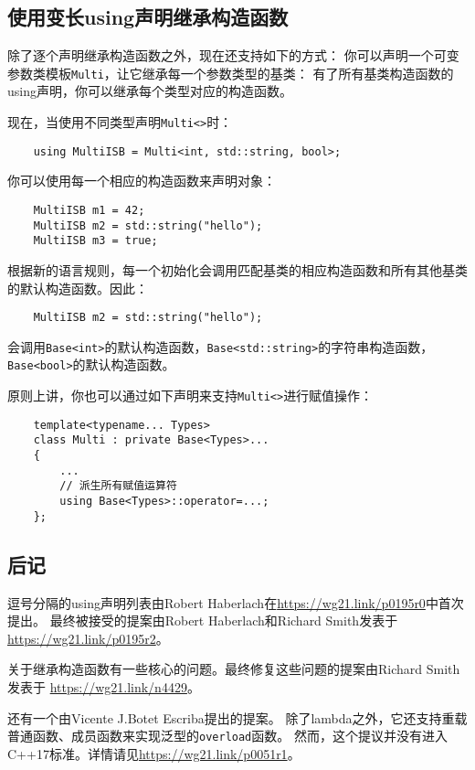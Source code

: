 \subsection{使用变长using声明继承构造函数}
除了逐个声明继承构造函数之外，现在还支持如下的方式：
你可以声明一个可变参数类模板\texttt{Multi}，让它继承每一个参数类型的基类：
有了所有基类构造函数的using声明，你可以继承每个类型对应的构造函数。

现在，当使用不同类型声明\texttt{Multi<>}时：
\begin{lstlisting}
    using MultiISB = Multi<int, std::string, bool>;
\end{lstlisting}
你可以使用每一个相应的构造函数来声明对象：
\begin{lstlisting}
    MultiISB m1 = 42;
    MultiISB m2 = std::string("hello");
    MultiISB m3 = true;
\end{lstlisting}
根据新的语言规则，每一个初始化会调用匹配基类的相应构造函数和所有其他基类的默认构造函数。因此：
\begin{lstlisting}
    MultiISB m2 = std::string("hello");
\end{lstlisting}
会调用\texttt{Base<int>}的默认构造函数，\texttt{Base<std::string>}的字符串构造函数，
\texttt{Base<bool>}的默认构造函数。

原则上讲，你也可以通过如下声明来支持\texttt{Multi<>}进行赋值操作：
\begin{lstlisting}
    template<typename... Types>
    class Multi : private Base<Types>...
    {
        ...
        // 派生所有赋值运算符
        using Base<Types>::operator=...;
    };
\end{lstlisting}

\subsection{后记}
逗号分隔的using声明列表由Robert Haberlach在\url{https://wg21.link/p0195r0}中首次提出。
最终被接受的提案由Robert Haberlach和Richard Smith发表于\url{https://wg21.link/p0195r2}。

关于继承构造函数有一些核心的问题。最终修复这些问题的提案由Richard Smith发表于
\url{https://wg21.link/n4429}。

还有一个由Vicente J.Botet Escriba提出的提案。
除了lambda之外，它还支持重载普通函数、成员函数来实现泛型的\texttt{overload}函数。
然而，这个提议并没有进入C++17标准。详情请见\url{https://wg21.link/p0051r1}。